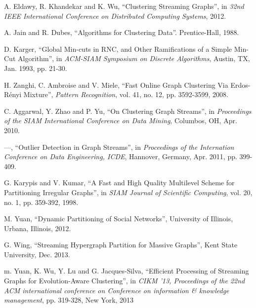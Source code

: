 \documentclass[a4paper,11pt]{article}
\begin{document}
\begin{thebibliography}
 A. Eldawy, R. Khandekar and K. Wu, ``Clustering Streaming Graphs'', in \textit{32nd IEEE International Conference on Distributed Computing Systems}, 2012.

 A. Jain and R. Dubes, ``Algorithms for Clustering Data''. Prentice-Hall, 1988.

 D. Karger, ``Global Min-cuts in RNC, and Other Ramifications of a Simple Min-Cut Algorithm'', in \textit{ACM-SIAM Symposium on Discrete Algorithms}, Austin, TX, Jan. 1993, pp. 21-30.

 H. Zanghi, C. Ambroise and V. Miele, ``Fast Online Graph Clustering Via Erdos-Rényi Mixture'', \textit{Pattern Recognition}, vol. 41, no. 12, pp. 3592-3599, 2008.

 C. Aggarwal, Y. Zhao and P. Yu, ``On Clustering Graph Streams'', in \textit{Proceedings of the SIAM International Conference on Data Mining}, Columbos, OH, Apr. 2010.

 ---,  ``Outlier Detection in Graph Streams'', in \textit{Proceedings of the Internation Conference on Data Engineering, ICDE}, Hannover, Germany, Apr. 2011, pp. 399-409.

 G. Karypis and V. Kumar, ``A Fast and High Quality Multilevel Scheme for Partitioning Irregular Graphs'', in \textit{SIAM Journal of Scientific Computing}, vol. 20, no. 1, pp. 359-392, 1998.

 M. Yuan, ``Dynamic Partitioning of Social Networks'', University of Illinois, Urbana, Illinois, 2012.

 G. Wing, ``Streaming Hypergraph Partition for Massive Graphs'', Kent State University, Dec. 2013.

 m. Yuan, K. Wu, Y. Lu and G. Jacques-Silva, ``Efficient Processing of Streaming Graphs for Evolution-Aware Clustering'', in \textit{CIKM '13, Proceedings of the 22nd ACM international conference on Conference on information & knowledge management}, pp. 319-328, New York, 2013

\end{thebibliography}
\end{document}
